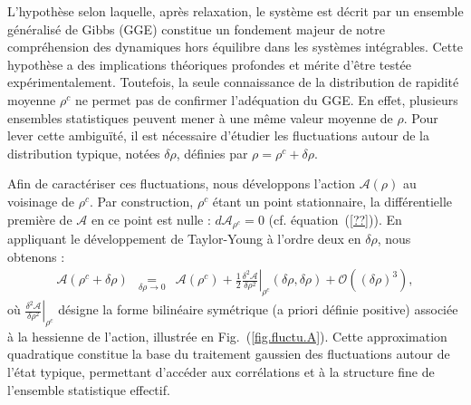 {%


}





L’hypothèse selon laquelle, après relaxation, le système est décrit par un ensemble généralisé de Gibbs (GGE) constitue un fondement majeur de notre compréhension des dynamiques hors équilibre dans les systèmes intégrables. Cette hypothèse a des implications théoriques profondes et mérite d’être testée expérimentalement. Toutefois, la seule connaissance de la distribution de rapidité moyenne \( \rho^c \) ne permet pas de confirmer l'adéquation du GGE. En effet, plusieurs ensembles statistiques peuvent mener à une même valeur moyenne de \( \rho \). Pour lever cette ambiguïté, il est nécessaire d’étudier les fluctuations autour de la distribution typique, notées \( \delta \rho \), définies par \( \rho = \rho^c + \delta \rho \).

Afin de caractériser ces fluctuations, nous développons l’action \( \mathcal{A}(\rho) \) au voisinage de \( \rho^c \). Par construction, \( \rho^c \) étant un point stationnaire, la différentielle première de \( \mathcal{A} \) en ce point est nulle : \( d\mathcal{A}_{\rho^c} = 0 \) (cf. équation~(\ref{??})). En appliquant le développement de Taylor-Young à l’ordre deux en \( \delta \rho \), nous obtenons :
\begin{eqnarray*}
	\mathcal{A}(\rho^c + \delta \rho) & \underset{ \delta \rho \to 0 }{=} & \mathcal{A}(\rho^c)  + \frac{1}{2} \left. \frac{\delta^2 \mathcal{A}}{\delta \rho^2} \right|_{\rho^c} (\delta \rho, \delta \rho) + \mathcal{O}((\delta \rho)^3),
\end{eqnarray*}
où \( \left. \frac{\delta^2 \mathcal{A}}{\delta \rho^2} \right|_{\rho^c} \) désigne la forme bilinéaire symétrique (a priori définie positive) associée à la hessienne de l’action, illustrée en Fig.~(\ref{fig.fluctu.A}). Cette approximation quadratique constitue la base du traitement gaussien des fluctuations autour de l’état typique, permettant d’accéder aux corrélations et à la structure fine de l’ensemble statistique effectif.





